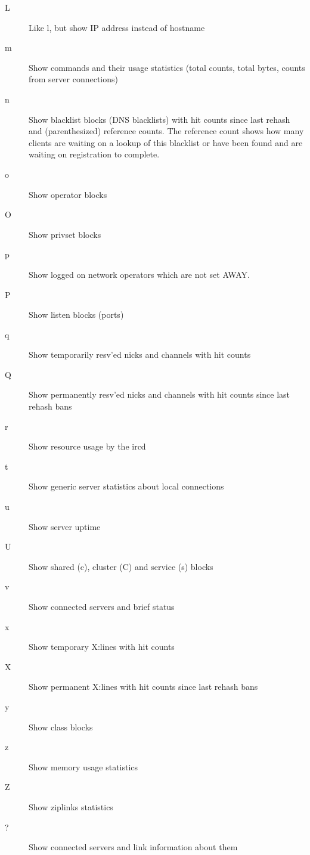 \begin{description}
\item[{L}]
	Like l, but show IP address instead of hostname

\item[{m}]
	Show commands and their usage statistics (total counts, total bytes,
	counts from server connections)

\item[{n}]
	Show blacklist blocks (DNS blacklists) with hit counts since last
	rehash and (parenthesized) reference counts. The reference count shows
	how many clients are waiting on a lookup of this blacklist or have been
	found and are waiting on registration to complete.

\item[{o}]
	Show operator blocks

\item[{O}]
	Show privset blocks

\item[{p}]
	Show logged on network operators which are not set AWAY.

\item[{P}]
	Show listen blocks (ports)

\item[{q}]
	Show temporarily resv'ed nicks and channels with hit counts

\item[{Q}]
	Show permanently resv'ed nicks and channels with hit counts since last
	rehash bans

\item[{r}]
	Show resource usage by the ircd

\item[{t}]
	Show generic server statistics about local connections

\item[{u}]
	Show server uptime

\item[{U}]
	Show shared (c), cluster (C) and service (s) blocks

\item[{v}]
	Show connected servers and brief status

\item[{x}]
	Show temporary X:lines with hit counts

\item[{X}]
	Show permanent X:lines with hit counts since last rehash bans

\item[{y}]
	Show class blocks

\item[{z}]
	Show memory usage statistics

\item[{Z}]
	Show ziplinks statistics

\item[{?}]
	Show connected servers and link information about them
\end{description}

